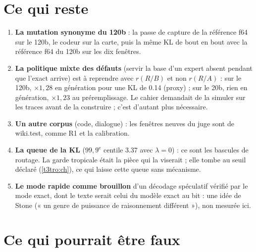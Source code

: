 \section{Ce qui reste}\label{t3sno:sec:reste}

\begin{enumerate}
\item \textbf{La mutation synonyme du 120b} : la passe de capture de la référence f64 sur le 120b, le codeur sur la carte, puis la même KL de bout en bout avec la référence f64 du 120b sur les dix fenêtres.
\item \textbf{La politique mixte des défauts} (servir la base d'un expert absent pendant que l'exact arrive) est à reprendre avec $r(R/B)$ et non $r(R/A)$ : sur le 120b, $\times 1{,}28$ en génération pour une KL de \num{0.14} (proxy) ; sur le 20b, rien en génération, $\times 1{,}23$ au préremplissage. Le cahier demandait de la simuler sur les traces avant de la construire ; c'est d'autant plus nécessaire.
\item \textbf{Un autre corpus} (code, dialogue) : les fenêtres neuves du juge sont de wiki.test, comme R1 et la calibration.
\item \textbf{La queue de la KL} ($99{,}9^{\text{e}}$ centile \num{3.37} avec $\lambda = 0$) : ce sont les bascules de routage. La garde tropicale était la pièce qui la viserait ; elle tombe au seuil déclaré (\cref{t3tro:ch}), ce qui laisse cette queue sans mécanisme.
\item \textbf{Le mode rapide comme brouillon} d'un décodage spéculatif vérifié par le mode exact, dont le texte serait celui du modèle exact au bit : une idée de Stone (« un genre de puissance de raisonnement différent »), non mesurée ici.
\end{enumerate}

\section{Ce qui pourrait être faux}\label{t3sno:sec:faux}

